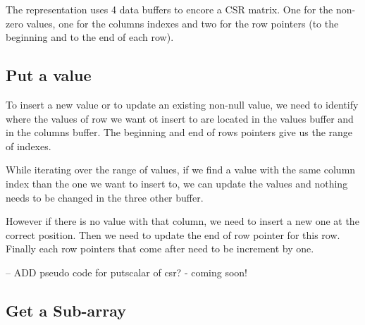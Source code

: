 The representation uses 4 data buffers to encore a CSR matrix. One for the non-zero values, one for the columns indexes and two for the row pointers (to the beginning and to the end of each row).

\subsection{Put a value}

To insert a new value or to update an existing non-null value, we need to identify where the values of row we want ot insert to are located in the values buffer and in the columns buffer. The beginning and end of rows pointers give us the range of indexes.

While iterating over the range of values, if we find a value with the same column index than the one we want to insert to, we can update the values and nothing needs to be changed in the three other buffer. 

However if there is no value with that column, we need to insert a new one at the correct position. Then we need to update the end of row pointer for this row. Finally each row pointers that come after need to be increment by one.

-- ADD pseudo code for putscalar of csr? - coming soon!



\subsection{Get a Sub-array}

